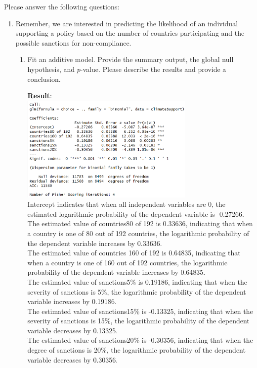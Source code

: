 \documentclass[12pt,letterpaper]{article}
\begin{document}
\newpage
\noindent Please answer the following questions:

\begin{enumerate}
	\item
	Remember, we are interested in predicting the likelihood of an individual supporting a policy based on the number of countries participating and the possible sanctions for non-compliance.
	\begin{enumerate}
		\item [] Fit an additive model. Provide the summary output, the global null hypothesis, and $p$-value. Please describe the results and provide a conclusion.
		 
		\textbf{Result}:\\
		\includegraphics[width=0.7\textwidth]{Q1.png}\\
		Intercept indicates that when all independent variables are 0, the estimated logarithmic probability of the dependent variable is -0.27266.\\
		The estimated value of countries80 of 192 is 0.33636, indicating that when a country is one of 80 out of 192 countries, the logarithmic probability of the dependent variable increases by 0.33636.\\
		The estimated value of countries 160 of 192 is 0.64835, indicating that when a country is one of 160 out of 192 countries, the logarithmic probability of the dependent variable increases by 0.64835.\\
		The estimated value of sanctions5\% is 0.19186, indicating that when the severity of sanctions is 5\%, the logarithmic probability of the dependent variable increases by 0.19186.\\
		The estimated value of sanctions15\% is -0.13325, indicating that when the severity of sanctions is 15\%, the logarithmic probability of the dependent variable decreases by 0.13325.\\
		The estimated value of sanctions20\% is -0.30356, indicating that when the degree of sanctions is 20\%, the logarithmic probability of the dependent variable decreases by 0.30356.\\

\end{enumerate}
\end{enumerate}
\end{document}
